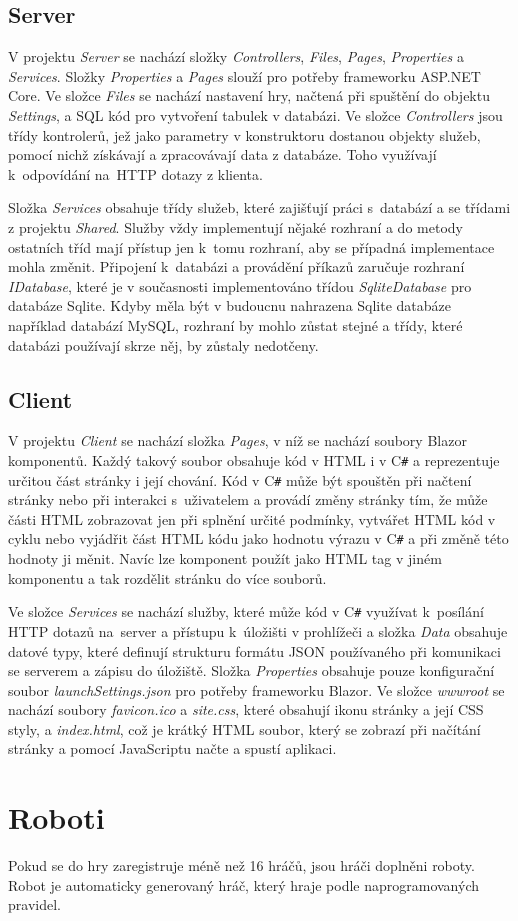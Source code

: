 \documentclass[a4paper,12pt]{article}
\def\CS{C\texttt{\#}}
\begin{document}
\subsection{Server}
V projektu \textit{Server} se nachází složky \textit{Controllers}, \textit{Files}, \textit{Pages}, \textit{Properties} a \textit{Services}. Složky \textit{Properties} a \textit{Pages} slouží pro potřeby frameworku ASP.NET Core. Ve složce \textit{Files} se nachází nastavení hry, načtená při spuštění do objektu \textit{Settings}, a SQL kód pro vytvoření tabulek v databázi. Ve složce \textit{Controllers} jsou třídy kontrolerů, jež jako parametry v konstruktoru dostanou objekty služeb, pomocí nichž získávají a zpracovávají data z databáze. Toho využívají k~odpovídání na~HTTP dotazy z klienta.

Složka \textit{Services} obsahuje třídy služeb, které zajišťují práci s~databází a se třídami z projektu \textit{Shared}. Služby vždy implementují nějaké rozhraní a do metody ostatních tříd mají přístup jen k~tomu rozhraní, aby se případná implementace mohla změnit. Připojení k~databázi a provádění příkazů zaručuje rozhraní \textit{IDatabase}, které je v současnosti implementováno třídou \textit{SqliteDatabase} pro databáze Sqlite. Kdyby měla být v budoucnu nahrazena Sqlite databáze například databází MySQL, rozhraní by mohlo zůstat stejné a třídy, které databázi používají skrze něj, by zůstaly nedotčeny.

\subsection{Client}
V projektu \textit{Client} se nachází složka \textit{Pages}, v níž se nachází soubory Blazor komponentů. Každý takový soubor obsahuje kód v HTML i v \CS{} a reprezentuje určitou část stránky i její chování. Kód v \CS{} může být spouštěn při načtení stránky nebo při interakci s~uživatelem a provádí změny stránky tím, že může části HTML zobrazovat jen při splnění určité podmínky, vytvářet HTML kód v cyklu nebo vyjádřit část HTML kódu jako hodnotu výrazu v \CS{} a při změně této hodnoty ji měnit. Navíc lze komponent použít jako HTML tag v jiném komponentu a tak rozdělit stránku do více souborů.

Ve složce \textit{Services} se nachází služby, které může kód v \CS{} využívat k~posílání HTTP dotazů na~server a přístupu k~úložišti v prohlížeči a složka \textit{Data} obsahuje datové typy, které definují strukturu formátu JSON používaného při komunikaci se serverem a zápisu do úložiště. Složka \textit{Properties} obsahuje pouze konfigurační soubor \textit{launchSettings.json} pro potřeby frameworku Blazor. Ve složce \textit{wwwroot} se nachází soubory \textit{favicon.ico} a \textit{site.css}, které obsahují ikonu stránky a její CSS styly, a \textit{index.html}, což je krátký HTML soubor, který se zobrazí při načítání stránky a pomocí JavaScriptu načte a spustí aplikaci.

\section{Roboti}
Pokud se do hry zaregistruje méně než 16 hráčů, jsou hráči doplněni roboty. Robot je automaticky generovaný hráč, který hraje podle naprogramovaných pravidel.

\newpage
\printbibliography[heading=bibintoc, title={Použitá literatura}]
\end{document}
